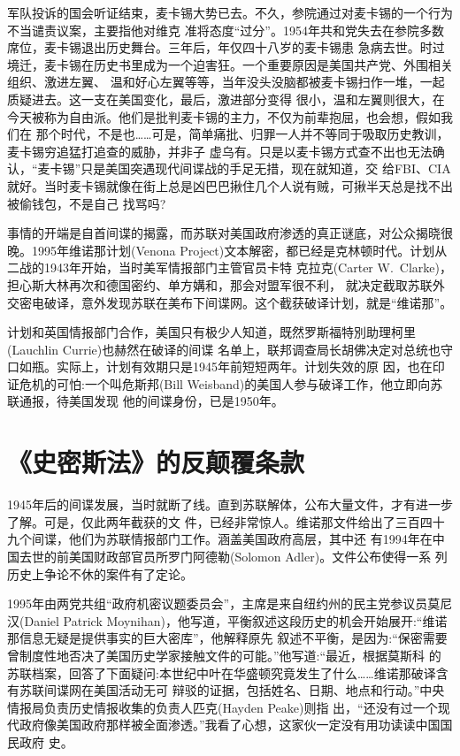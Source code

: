 \documentclass[10pt]{article}
\begin{document}
{军队投诉的国会听证结束，麦卡锡大势已去。不久，参院通过对麦卡锡的一个行为不当谴责议案，主要指他对维克
准将态度``过分''。1954年共和党失去在参院多数席位，麦卡锡退出历史舞台。三年后，年仅四十八岁的麦卡锡患
急病去世。时过境迁，麦卡锡在历史书里成为一个迫害狂。一个重要原因是美国共产党、外围相关组织、激进左翼、
温和好心左翼等等，当年没头没脑都被麦卡锡扫作一堆，一起质疑进去。这一支在美国变化，最后，激进部分变得
很小，温和左翼则很大，在今天被称为自由派。他们是批判麦卡锡的主力，不仅为前辈抱屈，也会想，假如我们在
那个时代，不是也……可是，简单痛批、归罪一人并不等同于吸取历史教训，麦卡锡穷追猛打追查的威胁，并非子
虚乌有。只是以麦卡锡方式查不出也无法确认，``麦卡锡''只是美国突遇现代间谍战的手足无措，现在就知道，交
给FBI、CIA就好。当时麦卡锡就像在街上总是凶巴巴揪住几个人说有贼，可揪半天总是找不出被偷钱包，不是自己
找骂吗?

事情的开端是自首间谍的揭露，而苏联对美国政府渗透的真正谜底，对公众揭晓很晚。1995年维诺那计划(Venona
Project)文本解密，都已经是克林顿时代。计划从二战的1943年开始，当时美军情报部门主管官员卡特
\textperiodcentered 克拉克(Carter W.~Clarke)，担心斯大林再次和德国密约、单方媾和，那会对盟军很不利，
就决定截取苏联外交密电破译，意外发现苏联在美布下间谍网。这个截获破译计划，就是``维诺那''。

计划和英国情报部门合作，美国只有极少人知道，既然罗斯福特別助理柯里(Lauchlin Currie)也赫然在破译的间谍
名单上，联邦调查局长胡佛决定对总统也守口如瓶。实际上，计划有效期只是1945年前短短两年。计划失效的原
因，也在印证危机的可怕:一个叫危斯邦(Bill Weisband)的美国人参与破译工作，他立即向苏联通报，待美国发现
他的间谍身份，已是1950年。

\pagebreak
\section{《史密斯法》的反颠覆条款}

1945年后的间谍发展，当时就断了线。直到苏联解体，公布大量文件，才有进一步了解。可是，仅此两年截获的文
件，已经非常惊人。维诺那文件给出了三百四十九个间谍，他们为苏联情报部门工作。涵盖美国政府高层，其中还
有1994年在中国去世的前美国财政部官员所罗门\textperiodcentered 阿德勒(Solomon Adler)。文件公布使得一系
列历史上争论不休的案件有了定论。

1995年由两党共组``政府机密议题委员会''，主席是来自纽约州的民主党参议员莫尼汉(Daniel Patrick
Moynihan)，他写道，平衡叙述这段历史的机会开始展开:``维诺那信息无疑是提供事实的巨大密库''，他解释原先
叙述不平衡，是因为:``保密需要曾制度性地否决了美国历史学家接触文件的可能。''他写道:``最近，根据莫斯科
的苏联档案，回答了下面疑问:本世纪中叶在华盛顿究竟发生了什么……维诺那破译含有苏联间谍网在美国活动无可
辩驳的证据，包括姓名、日期、地点和行动。''中央情报局负责历史情报收集的负责人匹克(Hayden Peake)则指
出，``还没有过一个现代政府像美国政府那样被全面渗透。''我看了心想，这家伙一定没有用功读读中国国民政府
史。

}
\end{document}
